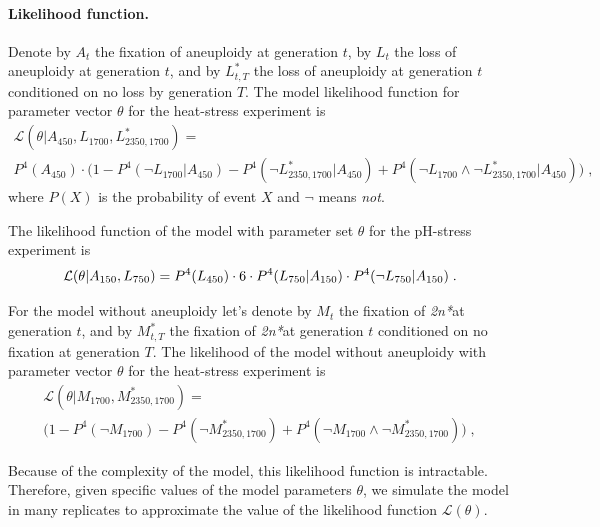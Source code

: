 \documentclass[12pt]{extarticle}
\newcommand{\likelihood}{\mathcal{L}}
\newcommand{\eumt}{\emph{2n*}}
\begin{document}
\paragraph{Likelihood function.}
Denote by $A_{t}$ the fixation of aneuploidy at generation $t$, by $L_{t}$ the loss of aneuploidy at generation $t$, and by $L^*_{t,T}$ the loss of aneuploidy at generation $t$ conditioned on no loss by generation $T$.
The model likelihood function for parameter vector $\theta$ for the heat-stress experiment is
\begin{multline} \label{eq:heatstress-likelihood}
\likelihood(\theta | A_{450}, L_{1700}, L^*_{2350, 1700} ) = \\
P^4(A_{450}) \cdot \Big(1 - P^4(\lnot{L_{1700}} | A_{450} ) - P^4(\lnot{L^*_{2350, 1700}}| A_{450}) + P^4(\lnot{L_{1700}} \land \lnot{L^*_{2350, 1700}}| A_{450})\Big)	\;,	
\end{multline}
where $P(X)$ is the probability of event $X$ and $\lnot$ means \emph{not}. 

The likelihood function of the model with parameter set $\theta$ for the pH-stress experiment is
\begin{equation} \label{eq:phstress-likelihood}
\likelihood(\theta | A_{150}, L_{750} ) = \\
 P^4(L_{450}) \cdot 6 \cdot	P^4(L_{750} | A_{150}) \cdot P^4(\lnot{L_{750}} | A_{150}) \;.  
 \end{equation} 
 
For the model without aneuploidy let's denote by $M_{t}$ the fixation of \eumt at generation $t$, and by $M^*_{t,T}$ the fixation of \eumt at generation $t$ conditioned on no fixation at generation $T$.
The likelihood of the model without aneuploidy with parameter vector $\theta$ for the heat-stress experiment is
\begin{multline} \label{eq:heatstress-noaneuploidy-likelihood}
\likelihood(\theta |  M_{1700}, M^*_{2350, 1700} ) = \\
\Big(1 - P^4(\lnot{M_{1700}}) - P^4(\lnot{M^*_{2350, 1700}}) + P^4(\lnot{M_{1700}} \land \lnot{M^*_{2350, 1700}})\Big)	\;,	
\end{multline}

Because of the complexity of the model, this likelihood function is intractable. Therefore, given specific values of the model parameters $\theta$, we simulate the model in many replicates to approximate the value of the likelihood function $\likelihood(\theta)$.
\end{document}
